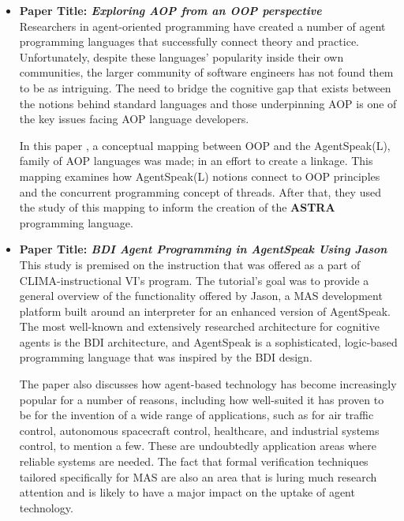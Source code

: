 \begin{itemize}[label={}]
\item \textbf{Paper Title: \textit{Exploring \ac{AOP} from an \ac{OOP} perspective}}\\

Researchers in agent-oriented programming have created a number of agent programming languages that successfully connect theory and practice. Unfortunately, despite these languages' popularity inside their own communities, the larger community of software engineers has not found them to be as intriguing. The need to bridge the cognitive gap that exists between the notions behind standard languages and those underpinning \ac{AOP} is one of the key issues facing \ac{AOP} language developers. 
 
 \vspace{.5cm}
 
In this paper \cite{astra}, a conceptual mapping between \ac{OOP} and the AgentSpeak(L), family of \ac{AOP} languages was made; in an effort to create a linkage. This mapping examines how AgentSpeak(L) notions connect to \ac{OOP} principles and the concurrent programming concept of threads. After that, they used the study of this mapping to inform the creation of the \textbf{ASTRA} programming language.

 \vspace{.5cm}
 
\item \textbf{Paper Title: \textit{\ac{BDI} Agent Programming in AgentSpeak Using Jason}} \\

This study \cite{jasonBDI} is premised on the instruction that was offered as a part of CLIMA-instructional VI's program. The tutorial's goal was to provide a general overview of the functionality offered by Jason, a \ac{MAS} development platform built around an interpreter for an enhanced version of AgentSpeak. The most well-known and extensively researched architecture for cognitive agents is the \ac{BDI} architecture, and AgentSpeak is a sophisticated, logic-based programming language that was inspired by the \ac{BDI} design.

\vspace{.5cm}

The paper also discusses how agent-based technology has become increasingly popular for a number of reasons, including how well-suited it has proven to be for the invention of a wide range of applications, such as for air traffic control, autonomous spacecraft control, healthcare, and industrial systems control, to mention a few. These are undoubtedly application areas where reliable systems are needed. The fact that formal verification techniques tailored specifically for \ac{MAS} are also an area that is luring much research attention and is likely to have a major impact on the uptake of agent technology.


\end{itemize}
